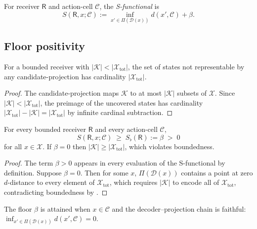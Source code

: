 \documentclass[twocolumn,11pt,a4paper]{article}
\newcommand{\Sfloor}{S_{\flat}}
\newcommand{\receiver}{\mathsf{R}}
\newcommand{\Cell}{\mathcal{C}}
\newcommand{\X}{\mathcal{X}}
\newcommand{\K}{\mathcal{K}}
\begin{document}
\begin{definition}[S-functional]\label{def:S}
For receiver $\receiver$ and action-cell $\Cell$, the \emph{S-functional}
is
\[
S(\receiver, x;\Cell) := \inf_{x'\in\Pi(\mathcal{D}(x))} d(x',\Cell) + \beta.
\]
\end{definition}

\subsection{Floor positivity}

\begin{lemma}\label{lem:residue}
For a bounded receiver with $|\K| < |\X_{\mathrm{tot}}|$, the set of states
not representable by any candidate-projection has cardinality
$|\X_{\mathrm{tot}}|$.
\end{lemma}

\begin{proof}
The candidate-projection maps $\K$ to at most $|\K|$ subsets of $\X$. Since
$|\K| < |\X_{\mathrm{tot}}|$, the preimage of the uncovered states has
cardinality $|\X_{\mathrm{tot}}| - |\K| = |\X_{\mathrm{tot}}|$ by
infinite cardinal subtraction.
\end{proof}

\begin{theorem}\label{thm:floor}
For every bounded receiver $\receiver$ and every action-cell $\Cell$,
\[
S(\receiver, x; \Cell) \;\geq\; \Sfloor(\receiver) := \beta \;>\; 0
\]
for all $x\in\X$. If $\beta = 0$ then $|\K| \geq |\X_{\mathrm{tot}}|$, which
violates boundedness.
\end{theorem}

\begin{proof}
The term $\beta > 0$ appears in every evaluation of the S-functional by
definition. Suppose $\beta = 0$. Then for some $x$, $\Pi(\mathcal{D}(x))$
contains a point at zero $d$-distance to every element of $\X_{\mathrm{tot}}$,
which requires $|\K|$ to encode all of $\X_{\mathrm{tot}}$, contradicting
boundedness by .
\end{proof}

\begin{corollary}[Attainment]\label{cor:attainment}
The floor $\beta$ is attained when $x\in\Cell$ and the decoder--projection
chain is faithful: $\inf_{x'\in\Pi(\mathcal{D}(x))}d(x',\Cell) = 0$.
\end{corollary}
\end{document}
